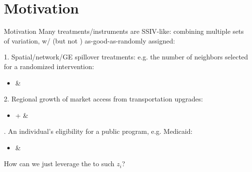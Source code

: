 \documentclass{beamer}
\begin{document}

\section{Motivation}

\begin{frame}{Motivation} 
Many treatments/instruments are SSIV-like: combining multiple sets of variation, w/ (but not ) as-good-as-randomly assigned:
	\vspace{0.3cm}\pause
	
	1. Spatial/network/GE spillover treatments: e.g. the number of neighbors selected for a randomized intervention:  
	\vspace{0.01cm}\pause
	\begin{itemize}
		\item {} \&  
	\end{itemize}
	\vspace{0.3cm}\pause
	
	2. Regional growth of market access from transportation upgrades:  
	\vspace{0.01cm}\pause
	\begin{itemize}
		\item {} +  \& 
	\end{itemize}
	
	\vspace{0.3cm}. An individual's eligibility for a public program, e.g. Medicaid:
	\vspace{0.01cm}\pause
	\begin{itemize}
		\item {} \& 
	\end{itemize}
	\vspace{0.3cm}\pause 
	
	How can we just leverage the  to such $z_i$?
\end{frame}
\end{document}
